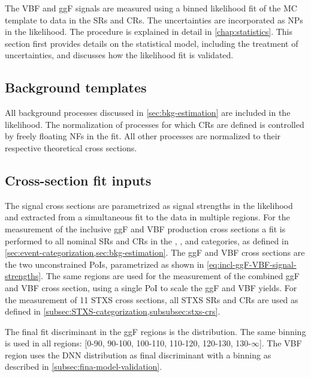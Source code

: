 
The VBF and ggF signals are measured using a binned likelihood fit of the MC template to data in the SRs and CRs. The uncertainties are incorporated as NPs in the likelihood. The procedure is explained in detail in \cref{chap:statistics}. 
This section first provides details on the statistical model, including the treatment of uncertainties, and discusses how the likelihood fit is validated.

\subsection{Background templates}
All background processes discussed in \cref{sec:bkg-estimation} are included in the likelihood. 
The normalization of processes for which CRs are defined is controlled by freely floating NFs in the fit. All other processes are normalized to their respective theoretical cross sections.

\subsection{Cross-section fit inputs}
The signal cross sections are parametrized as signal strengths in the likelihood and extracted from a simultaneous fit to the data in multiple regions.
For the measurement of the inclusive ggF and VBF production cross sections a fit is performed to all nominal SRs and CRs in the \ZeroJet, \OneJet, and \TwoJet categories, as defined in \cref{sec:event-categorization,sec:bkg-estimation}. 
The ggF and VBF cross sections are the two unconstrained PoIs, parametrized as shown in \cref{eq:incl-ggF-VBF-signal-strengths}.
The same regions are used for the measurement of the combined ggF and VBF cross section, using a single PoI to scale the ggF and VBF yields. 
For the measurement of 11 STXS cross sections, all STXS SRs and CRs are used as defined in \cref{subsec:STXS-categorization,subsubsec:stxs-crs}.

The final fit discriminant in the ggF regions is the \mT distribution. The same binning is used in all regions: [0-90, 90-100, 100-110, 110-120, 120-130, 130-$\infty$]. 
The VBF region uses the DNN distribution as final discriminant with a binning as described in \cref{subsec:fina-model-validation}.

